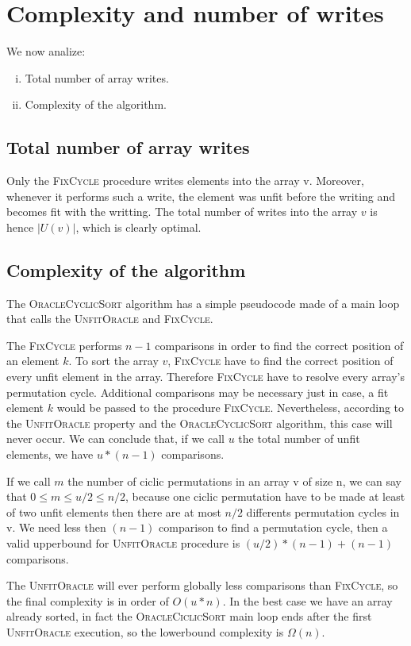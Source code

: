 \section{Complexity and number of writes}

We now analize:
\begin{enumerate}[i.]
\item Total number of array writes.
\item Complexity of the algorithm.
\end{enumerate}

\subsection{Total number of array writes}

Only the \textsc{FixCycle} procedure writes elements into the array v.
Moreover, whenever it performs such a write, the element was unfit 
before the writing and becomes fit with the writting.
The total number of writes into the array $v$ is hence $|U(v)|$, which is 
clearly optimal.

\subsection{Complexity of the algorithm}

The \textsc{OracleCyclicSort} algorithm has a simple pseudocode made of a main loop that calls the \textsc{UnfitOracle} and \textsc{FixCycle}.

The \textsc{FixCycle} performs $n-1$ comparisons in order to find the correct position of an element $k$. To sort the array $v$, \textsc{FixCycle} have to find the correct position of every unfit element in the array. Therefore \textsc{FixCycle} have to resolve every array's permutation cycle.
Additional comparisons may be necessary just in case, a fit element $k$ would be passed to the procedure \textsc{FixCycle}. Nevertheless, according to the \textsc{UnfitOracle} property and the \textsc{OracleCyclicSort} algorithm, this case will never occur.
We can conclude that, if we call $u$ the total number of unfit elements, we have $u*(n-1)$ comparisons.

If we call $m$ the number of ciclic permutations in an array v of size n, we can say that $0 \le m \le u/2 \le n/2$, because one ciclic permutation have to be made at least of two unfit elements then there are at most $n/2$ differents permutation cycles in v.
We need less then $(n-1)$ comparison to find a permutation cycle, then a valid upperbound for \textsc{UnfitOracle} procedure is $(u/2)*(n-1) + (n-1)$ comparisons.

The \textsc{UnfitOracle} will ever perform globally less comparisons than \textsc{FixCycle}, so the final complexity is in order of $O(u*n)$.
In the best case we have an array already sorted, in fact the \textsc{OracleCiclicSort} main loop ends after the first \textsc{UnfitOracle} execution, so the lowerbound complexity is $\Omega(n)$.
